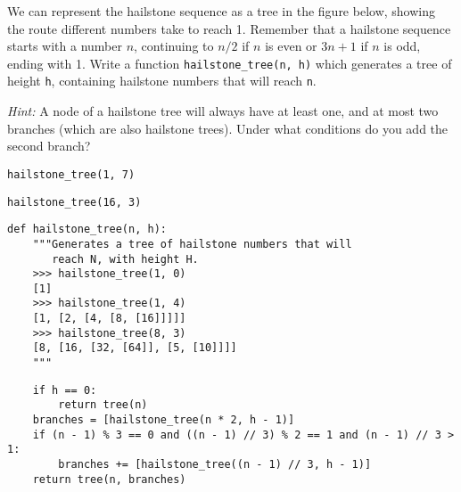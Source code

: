 \question We can represent the hailstone sequence as a tree in the figure below,
showing the route different numbers take to reach 1. Remember that a hailstone
sequence starts with a number $n$, continuing to $n/2$ if $n$ is even or $3n+1$
if $n$ is odd, ending with 1. Write a function \texttt{hailstone\_tree(n, h)}
which generates a tree of height \texttt{h}, containing hailstone numbers that
will reach \texttt{n}.

\bigskip

\textit{Hint:} A node of a hailstone tree will always have at least one, and at most two branches (which are also hailstone trees). Under what conditions do you add the second branch?

\begin{center}

  \texttt{hailstone\_tree(1, 7)}


  \texttt{hailstone\_tree(16, 3)}

\end{center}

\begin{lstlisting}
def hailstone_tree(n, h):
    """Generates a tree of hailstone numbers that will
       reach N, with height H.
    >>> hailstone_tree(1, 0)
    [1]
    >>> hailstone_tree(1, 4)
    [1, [2, [4, [8, [16]]]]]
    >>> hailstone_tree(8, 3)
    [8, [16, [32, [64]], [5, [10]]]]
    """
\end{lstlisting}
\begin{solution}
\begin{lstlisting}
    if h == 0:
        return tree(n)
    branches = [hailstone_tree(n * 2, h - 1)]
    if (n - 1) % 3 == 0 and ((n - 1) // 3) % 2 == 1 and (n - 1) // 3 > 1:
        branches += [hailstone_tree((n - 1) // 3, h - 1)]
    return tree(n, branches)
\end{lstlisting}
\end{solution}
